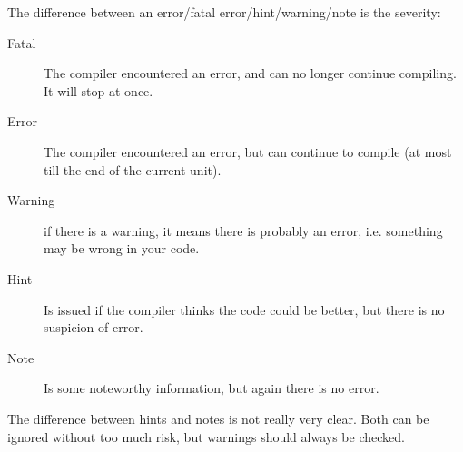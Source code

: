 %
% 
The difference between an error/fatal error/hint/warning/note is the severity:
\begin{description}
\item[Fatal] The compiler encountered an error, and can no longer continue
compiling. It will stop at once.
\item[Error] The compiler encountered an error, but can continue to compile
(at most till the end of the current unit).
\item[Warning] if there is a warning, it means there is probably an error,
i.e. something may be wrong in your code.
\item[Hint] Is issued if the compiler thinks the code could be better, but
there is no suspicion of error.
\item[Note] Is some noteworthy information, but again there is no error.
\end{description}
The difference between hints and notes is not really very clear. Both can
be ignored without too much risk, but warnings should always be checked.


%
%
